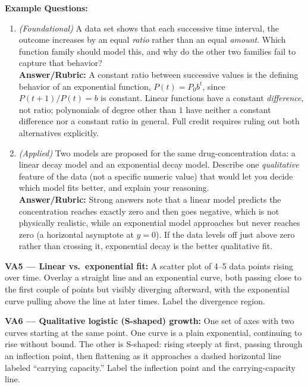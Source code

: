 \documentclass{article}
\begin{document}
\textbf{Example Questions:}
\begin{enumerate}[leftmargin=*]
  \item \textit{(Foundational)} A data set shows that each successive time interval, the outcome increases by an equal \emph{ratio} rather than an equal \emph{amount}. Which function family should model this, and why do the other two families fail to capture that behavior? \\
  \textbf{Answer/Rubric:} A constant ratio between successive values is the defining behavior of an exponential function, $P(t)=P_0b^t$, since $P(t+1)/P(t)=b$ is constant. Linear functions have a constant \emph{difference}, not ratio; polynomials of degree other than $1$ have neither a constant difference nor a constant ratio in general. Full credit requires ruling out both alternatives explicitly.
  \item \textit{(Applied)} Two models are proposed for the same drug-concentration data: a linear decay model and an exponential decay model. Describe one \emph{qualitative} feature of the data (not a specific numeric value) that would let you decide which model fits better, and explain your reasoning. \\
  \textbf{Answer/Rubric:} Strong answers note that a linear model predicts the concentration reaches exactly zero and then goes negative, which is not physically realistic, while an exponential model approaches but never reaches zero (a horizontal asymptote at $y=0$). If the data levels off just above zero rather than crossing it, exponential decay is the better qualitative fit.
\end{enumerate}

\begin{instrnote}
\textbf{VA5 --- Linear vs.\ exponential fit:} A scatter plot of 4--5 data points rising over time. Overlay a straight line and an exponential curve, both passing close to the first couple of points but visibly diverging afterward, with the exponential curve pulling above the line at later times. Label the divergence region.

\textbf{VA6 --- Qualitative logistic (S-shaped) growth:} One set of axes with two curves starting at the same point. One curve is a plain exponential, continuing to rise without bound. The other is S-shaped: rising steeply at first, passing through an inflection point, then flattening as it approaches a dashed horizontal line labeled ``carrying capacity.'' Label the inflection point and the carrying-capacity line.
\end{instrnote}
\end{document}
